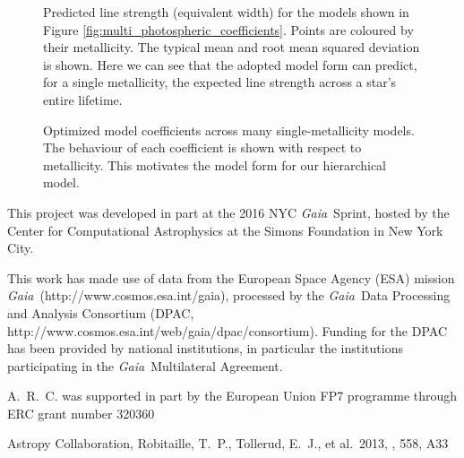 \documentclass{aastex61}
\newcommand{\project}[1]{\textsl{#1}}
\newcommand{\gaia}{\project{Gaia}}
\begin{document}
\begin{figure}
	\caption{
		Predicted line strength (equivalent width) for the models
		shown in Figure \ref{fig:multi_photospheric_coefficients}.
		Points are coloured by their metallicity.
		The typical mean and root mean squared deviation is shown.
		Here we can see that the adopted model form can predict,
		for a single metallicity, the expected line strength
		across a star's entire lifetime.
		\label{fig:multi_predicted_ew}}
\end{figure}


\begin{figure}
	\caption{
		Optimized model coefficients across many single-metallicity
		models.
		The behaviour of each coefficient is shown with respect to
		metallicity. This motivates the model form for our
		hierarchical model.
		\label{fig:multi_model_coefficients}}
\end{figure}


\acknowledgments

This project was developed in part at the 2016 NYC \gaia\ Sprint, hosted by the Center for Computational Astrophysics at the Simons Foundation in New York City.

This work has made use of data from the European Space Agency (ESA) mission \gaia\ (http://www.cosmos.esa.int/gaia), processed by the \gaia\ Data Processing and Analysis Consortium (DPAC, http://www.cosmos.esa.int/web/gaia/dpac/consortium). Funding for the DPAC has been provided by national institutions, in particular the institutions participating in the \gaia\ Multilateral Agreement.


A.~R.~C. was supported in part by the European Union FP7 programme through ERC grant number 320360




\begin{thebibliography}{}

 Astropy Collaboration, Robitaille, T.~P., Tollerud, E.~J., et al.\ 2013, \aap, 558, A33 

\end{thebibliography}
\end{document}
